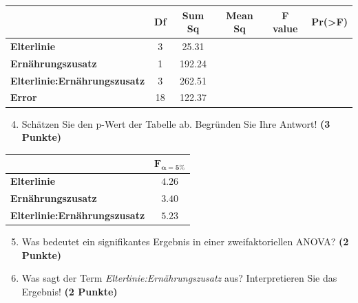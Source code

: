 \documentclass[a4paper, 9pt]{scrartcl}\usepackage[]{graphicx}\usepackage[]{xcolor}
\begin{document}
\vspace{1Ex}

\begin{center}
  \Large
  \begin{tabular}{lccccc}
  \toprule
     & \textbf{Df} & \textbf{Sum Sq} & \textbf{Mean Sq} & \textbf{F value} & \textbf{Pr(>F)} \strut\\
    \midrule
   \textbf{Elterlinie}  & 3 & 25.31 &  &  &  \strut\\
    \textbf{Ernährungszusatz}  & 1 & 192.24 &  &  &  \strut\\
    \textbf{Elterlinie:Ernährungszusatz}  & 3 & 262.51 &  &  &  \strut\\
   \textbf{Error}  & 18 & 122.37 &  &  &  \strut\\
\bottomrule
  \end{tabular}
\end{center}

\vspace{1Ex}

\begin{enumerate}
  \setcounter{enumi}{3}
\item Schätzen Sie den p-Wert der Tabelle ab. Begründen Sie Ihre
  Antwort! \textbf{(3 Punkte)}
\end{enumerate}
  
\begin{center}
    \Large
\begin{tabular}{lc}
  \toprule
     & $\boldsymbol{F_{\alpha = 5\%}}$ \\
\midrule
  \textbf{Elterlinie} & $4.26$ \\
  \textbf{Ernährungszusatz} & $3.40$ \\
  \textbf{Elterlinie:Ernährungszusatz} & $5.23$ \\
  \bottomrule
  \end{tabular}
\end{center}

\begin{enumerate}
  \setcounter{enumi}{4}
\item Was bedeutet ein signifikantes Ergebnis in einer zweifaktoriellen ANOVA? \textbf{(2 Punkte)}
\item Was sagt der Term \textit{Elterlinie:Ernährungszusatz} aus? Interpretieren Sie das Ergebnis! \textbf{(2 Punkte)}
\end{enumerate}
 
\clearpage
\end{document}
